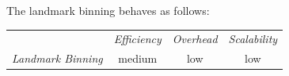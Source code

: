 %
%
%
%
The landmark binning behaves as follows:
\begin{center}
{\footnotesize
\begin{tabular}{rccc}
\multicolumn{1}{r}{} &
\multicolumn{1}{c}{\emph{Efficiency}} &
\multicolumn{1}{c}{\emph{Overhead}} &
\multicolumn{1}{c}{\emph{Scalability}}
\\
\cline{2-4}
\emph{Landmark Binning} &
medium &
low &
low
\end{tabular}
}
\end{center}

